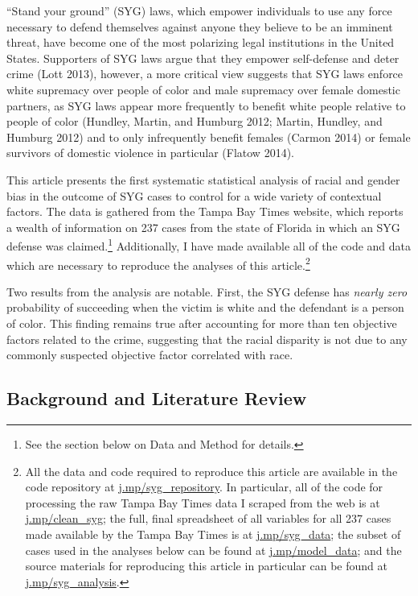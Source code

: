 \documentclass[12pt,article]{article}
\begin{document}
``Stand your ground'' (SYG) laws, which empower individuals to use any
force necessary to defend themselves against anyone they believe to be
an imminent threat, have become one of the most polarizing legal
institutions in the United States. Supporters of SYG laws argue that
they empower self-defense and deter crime (Lott 2013), however, a more
critical view suggests that SYG laws enforce white supremacy over people
of color and male supremacy over female domestic partners, as SYG laws
appear more frequently to benefit white people relative to people of
color (Hundley, Martin, and Humburg 2012; Martin, Hundley, and Humburg
2012) and to only infrequently benefit females (Carmon 2014) or female
survivors of domestic violence in particular (Flatow 2014).

This article presents the first systematic statistical analysis of
racial and gender bias in the outcome of SYG cases to control for a wide
variety of contextual factors. The data is gathered from the Tampa Bay
Times website, which reports a wealth of information on 237 cases from
the state of Florida in which an SYG defense was claimed.\footnote{See
  the section below on Data and Method for details.} Additionally, I
have made available all of the code and data which are necessary to
reproduce the analyses of this article.\footnote{All the data and code
  required to reproduce this article are available in the code
  repository at \href{http://j.mp/syg_repository}{j.mp/syg\_repository}.
  In particular, all of the code for processing the raw Tampa Bay Times
  data I scraped from the web is at
  \href{http://j.mp/clean_syg}{j.mp/clean\_syg}; the full, final
  spreadsheet of all variables for all 237 cases made available by the
  Tampa Bay Times is at \href{http://j.mp/syg_data}{j.mp/syg\_data}; the
  subset of cases used in the analyses below can be found at
  \href{http://j.mp/model_data}{j.mp/model\_data}; and the source
  materials for reproducing this article in particular can be found at
  \href{http://j.mp/syg_analysis}{j.mp/syg\_analysis}.}

Two results from the analysis are notable. First, the SYG defense has
\emph{nearly zero} probability of succeeding when the victim is white
and the defendant is a person of color. This finding remains true after
accounting for more than ten objective factors related to the crime,
suggesting that the racial disparity is not due to any commonly
suspected objective factor correlated with race.

\subsection{Background and Literature
Review}\label{background-and-literature-review}
\end{document}
